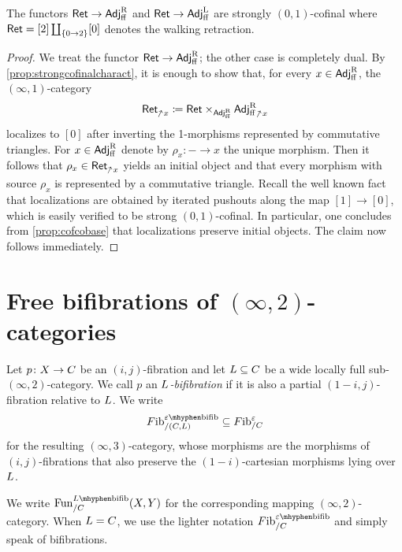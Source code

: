 \documentclass[a4paper,reqno,twoside]{amsart}
\begin{document}
\begin{proposition}\label{prop:adjffcofinal}
	 The functors $\mathsf{Ret} \to \mathsf{Adj}^{\operatorname{R}}_{\mathrm{ff}}$ and $\mathsf{Ret} \to \mathsf{Adj}^{\operatorname{L}}_{\mathrm{ff}}$ are strongly $(0,1)$-cofinal where $\mathsf{Ret}=[2]\coprod_{\{0 \to 2\}}[0]$ denotes the walking retraction.
\end{proposition}
\begin{proof}
	We treat the functor $\mathsf{Ret} \to \mathsf{Adj}^{\operatorname{R}}_{\mathrm{ff}}$; the other case is completely dual. By \cref{prop:strongcofinalcharact}, it is enough to show that, for every $x \in \mathsf{Adj}^{\operatorname{R}}_{\mathrm{ff}}$, the $(\infty,1)$-category
	\[
		\Ret_{\upslash x}\coloneq \Ret \times_{\Adjffr}{\Adjffr}_{\upslash x}
	\]
	localizes to $[0]$ after inverting the 1-morphisms represented by commutative triangles. For $x \in \mathsf{Adj}^{\operatorname{R}}_{\mathrm{ff}}$ denote by $\rho_x \colon - \to x$ the unique morphism. Then it follows that $\rho_x \in \Ret_{\upslash x}$ yields an initial object and that every morphism with source $\rho_x$ is represented by a commutative triangle. Recall the well known fact that localizations are obtained by iterated pushouts along the map $[1] \to [0]$, which is easily verified to be strong $(0,1)$-cofinal. In particular, one concludes from \cref{prop:cofcobase} that localizations preserve initial objects. The claim now follows immediately.
\end{proof}





\section{Free bifibrations of $(\infty,2)$-categories}



\begin{definition}\label{def:wcart}
	Let $p\colon\relax{X}\to\relax{C}$ be an $(i,j)$-fibration and let $\relax{L}\subseteq\relax{C}$ be a wide locally full sub-$(\infty,2)$-category. We call $p$ an \emph{$\relax{L}$-bifibration} if it is also a partial $(1-i,j)$-fibration relative to $\relax{L}$. We write
	\[
		\Fib_{/(\cC,\cL)}^{\epsilon\mhyphen\bifib}
		\subset \Fib_{/\cC}^{\epsilon}
	\]
	for the resulting $(\infty,3)$-category, whose morphisms are the morphisms of $(i,j)$-fibrations that also preserve the $(1-i)$-cartesian morphisms lying over $\relax{L}$.
\end{definition}

We write $\Fun_{/\cC}^{\cL\mhyphen\bifib}(\cX,\cY)$ for the corresponding mapping $(\infty,2)$-category. When $\relax{L}=\relax{C}$, we use the lighter notation $\Fib_{/\cC}^{\epsilon\mhyphen\bifib}$ and simply speak of bifibrations.
\end{document}

